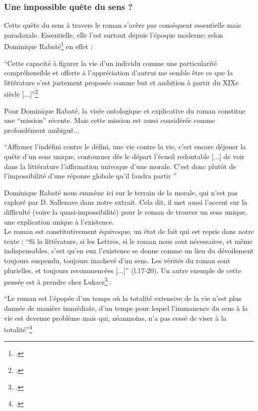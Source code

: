 \documentclass[a4paper,10pt]{article}
\begin{document}
			\subsubsection{Une impossible quête du sens ?}
				Cette quête du sens à travers le roman s'avère par conséquent essentielle mais paradoxale. Essentielle, elle l'est surtout depuis l'époque moderne; selon Dominique Rabaté\footcite{Rabate2010} en effet :
				\begin{center}
					\footnotesize
					\begin{minipage}{0.7\textwidth}
						``Cette capacité à figurer la vie d’un individu comme une particularité compréhensible
						et offerte à l’appréciation d’autrui me semble être ce que la littérature s’est justement proposée
						comme but et ambition à partir du XIXe siècle [...]''\footcite[p.~32-34]{Rabate2010}
					\end{minipage}
				\end{center}
				Pour Dominique Rabaté, la visée ontologique et explicative du roman constitue une ``mission'' récente. Mais cette mission est aussi considérée comme profondément ambiguë...
				\begin{center} 
					\footnotesize
					\begin{minipage}{0.7\textwidth}
						``Affirmer l’indéfini contre le défini, une vie contre la vie, c’est encore déjouer la quête d’un sens
						unique, contourner dès le départ l’écueil redoutable [...] de voir dans la littérature l’affirmation univoque d’une morale. C’est donc plutôt de l’impossibilité d’une réponse globale qu’il faudra partir ''
					\end{minipage}
				\end{center}
				Dominique Rabaté nous emmène ici sur le terrain de la morale, qui n'est pas exploré par D. Sallenave dans notre extrait. Cela dit, il met aussi l'accent sur la difficulté (voire la quasi-impossibilité) pour le roman de trouver un sens unique, une explication unique à l'existence.\\
				Le roman est constitutivement équivoque, un état de fait qui est repris dans notre texte : ``Si la littérature, si les Lettres, si le roman nous sont nécessaires, et même indispensables, c'est qu'en eux l'existence se donne comme un lieu du dévoilement toujours suspendu, toujours inachevé d'un sens. Les vérités du roman sont plurielles, et toujours recommencées [...]'' (l.17-20). Un autre exemple de cette pensée est à prendre chez Lukacs\footcite{Lukacs1916} :
				\begin{center}
					\footnotesize
					\begin{minipage}{0.7\textwidth}
						``Le roman est l'épopée d'un temps où la totalité extensive de la vie n'est plus donnée de manière immédiate, d'un temps pour lequel l'immanence du sens à la vie est devenue problème mais qui, néanmoins, n'a pas cessé de viser à la totalité''\footcite[p.~49]{Lukacs1916}
					\end{minipage}
				\end{center}
\end{document}
